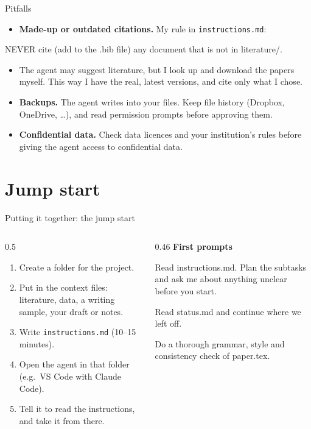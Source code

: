 \documentclass[aspectratio=169,11pt]{beamer}
\newcommand{\prompt}[1]{\begin{promptbox}\textcolor{accent}{\faCommentDots}\enspace #1\end{promptbox}}
\newcommand{\file}[1]{\texttt{#1}}
\newcommand{\icon}[1]{\textcolor{accent}{#1}}
\begin{document}
\begin{frame}{Pitfalls}
  \label{pitfalls}
  \begin{itemize}
    \item \icon{\faBook}\enspace\textbf{Made-up or outdated citations.} My rule in \file{instructions.md}:
  \end{itemize}
  \prompt{NEVER cite (add to the .bib file) any document that is not in literature/.}
  \begin{itemize}
    \item[] The agent may suggest literature, but I look up and download the papers myself. This way I have the real, latest versions, and cite only what I chose.
    \item \icon{\faSave}\enspace\textbf{Backups.} The agent writes into your files. Keep file history (Dropbox, OneDrive, \dots), and read permission prompts before approving them.
    \item \icon{\faLock}\enspace\textbf{Confidential data.} Check data licences and your institution's rules before giving the agent access to confidential data.
  \end{itemize}
\end{frame}

\section{Jump start}

\begin{frame}{Putting it together: the jump start}
  \begin{columns}[T]
    \begin{column}{0.5\textwidth}
      \begin{enumerate}
        \item Create a folder for the project.
        \item Put in the context files: literature, data, a writing sample, your draft or notes.
        \item Write \file{instructions.md} (10--15 minutes).
        \item Open the agent in that folder (e.g.\ VS Code with Claude Code).
        \item Tell it to read the instructions, and take it from there.
      \end{enumerate}
    \end{column}
    \begin{column}{0.46\textwidth}
      \textbf{First prompts}
      \prompt{Read instructions.md. Plan the subtasks and ask me about anything unclear before you start.}
      \prompt{Read status.md and continue where we left off.}
      \prompt{Do a thorough grammar, style and consistency check of paper.tex.}
    \end{column}
  \end{columns}
\end{frame}
\end{document}
